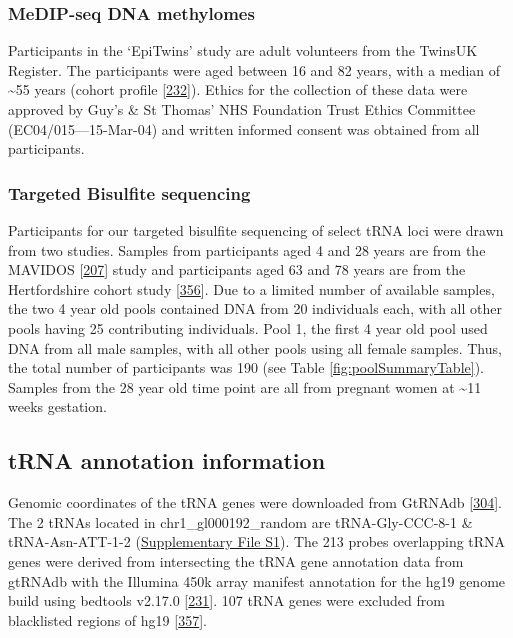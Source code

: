 \documentclass[
]{book}
\begin{document}
\hypertarget{medip-seq-dna-methylomes}{%
\subsubsection{MeDIP-seq DNA methylomes}\label{medip-seq-dna-methylomes}}

Participants in the `EpiTwins' study are adult volunteers from the TwinsUK Register.
The participants were aged between 16 and 82 years, with a median of \textasciitilde55 years (cohort profile {[}\protect\hyperlink{ref-Moayyeri2013}{232}{]}).
Ethics for the collection of these data were approved by Guy's \& St Thomas' NHS Foundation Trust Ethics Committee (EC04/015---15-Mar-04) and written informed consent was obtained from all participants.

\hypertarget{targeted-bisulfite-sequencing}{%
\subsubsection{Targeted Bisulfite sequencing}\label{targeted-bisulfite-sequencing}}

Participants for our targeted bisulfite sequencing of select tRNA loci were drawn from two studies.
Samples from participants aged 4 and 28 years are from the MAVIDOS {[}\protect\hyperlink{ref-Harvey2012a}{207}{]} study and participants aged 63 and 78 years are from the Hertfordshire cohort study {[}\protect\hyperlink{ref-Syddall2005}{356}{]}.
Due to a limited number of available samples, the two 4 year old pools contained DNA from 20 individuals each, with all other pools having 25 contributing individuals.
Pool 1, the first 4 year old pool used DNA from all male samples, with all other pools using all female samples.
Thus, the total number of participants was 190 (see Table \ref{fig:poolSummaryTable}).
Samples from the 28 year old time point are all from pregnant women at \textasciitilde11 weeks gestation.

\hypertarget{tRNAanno}{%
\subsection{tRNA annotation information}\label{tRNAanno}}

Genomic coordinates of the tRNA genes were downloaded from GtRNAdb {[}\protect\hyperlink{ref-Chan2009}{304}{]}.
The 2 tRNAs located in chr1\_gl000192\_random are tRNA-Gly-CCC-8-1 \& tRNA-Asn-ATT-1-2 (\href{./Supplementary_Files/hg19-tRNAs.bed}{Supplementary File S1}).
The 213 probes overlapping tRNA genes were derived from intersecting the tRNA gene annotation data from gtRNAdb with the Illumina 450k array manifest annotation for the hg19 genome build using bedtools v2.17.0 {[}\protect\hyperlink{ref-Quinlan2010}{231}{]}.
107 tRNA genes were excluded from blacklisted regions of hg19 {[}\protect\hyperlink{ref-Amemiya2019}{357}{]}.
\end{document}
